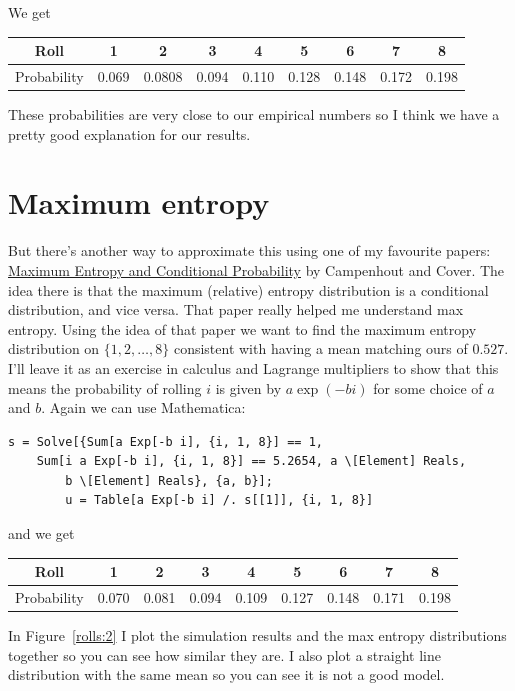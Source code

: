 \documentclass[12pt]{article}
\begin{document}
We get
\begin{center}
\begin{tabular}{|c|c|c|c|c|c|c|c|c|}
\hline
Roll & 1 & 2 & 3 & 4 & 5 & 6 & 7 & 8\\
\hline
Probability & 0.069 & 0.0808 & 0.094 & 0.110 & 0.128 & 0.148 & 0.172 & 0.198\\
\hline
\end{tabular}
\end{center}
These probabilities are very close to our empirical numbers so I think we have a pretty good explanation for our results.

\section{Maximum entropy}
But there's another way to approximate this using one of my favourite papers:
\href{https://purl.stanford.edu/kr402kg0888}{Maximum Entropy and Conditional Probability} by Campenhout and Cover.
The idea there is that the maximum (relative) entropy distribution is a conditional distribution, and vice versa.
That paper really helped me understand max entropy.
Using the idea of that paper we want to find the maximum entropy distribution on $\{1,2,\ldots,8\}$ consistent with having a mean matching ours of $0.527$.
I'll leave it as an exercise in calculus and Lagrange multipliers to show that this means the probability of rolling $i$ is given by $a\exp(-bi)$ for some choice of $a$ and $b$.
Again we can use Mathematica:

\begin{verbatim}
s = Solve[{Sum[a Exp[-b i], {i, 1, 8}] == 1, 
    Sum[i a Exp[-b i], {i, 1, 8}] == 5.2654, a \[Element] Reals, 
        b \[Element] Reals}, {a, b}];
        u = Table[a Exp[-b i] /. s[[1]], {i, 1, 8}]
\end{verbatim}
and we get
\begin{center}
\begin{tabular}{|c|c|c|c|c|c|c|c|c|}
\hline
Roll & 1 & 2 & 3 & 4 & 5 & 6 & 7 & 8\\
\hline
Probability & 0.070 & 0.081 & 0.094 & 0.109 & 0.127 & 0.148 & 0.171 & 0.198\\
\hline
\end{tabular}
\end{center}

In Figure~\ref{rolls:2} I plot the simulation results and the max entropy distributions together so you can see how similar they are.
I also plot a straight line distribution with the same mean so you can see it is not a good model.
\end{document}
